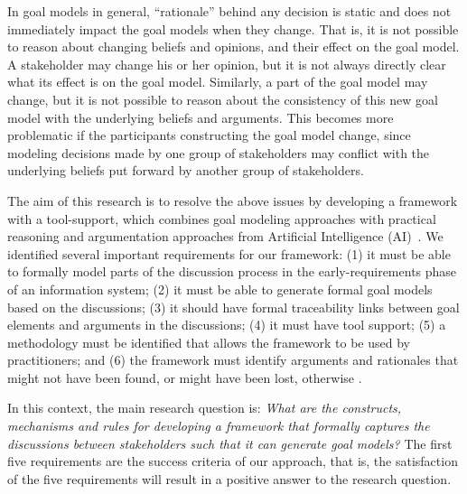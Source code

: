 \begin{enumerate}
In goal models in general, ``rationale'' behind any decision is static and does not immediately impact the goal models when they change. That is, it is not possible to reason about changing beliefs and opinions, and their effect on the goal model. A stakeholder may change his or her opinion, but it is not always directly clear what its effect is on the goal model. Similarly, a part of the goal model may change, but it is not possible to reason about the consistency of this new goal model with the underlying beliefs and arguments. This becomes more problematic if the participants constructing the goal model change, since modeling decisions made by one group of stakeholders may conflict with the underlying beliefs put forward by another group of stakeholders.
\end{enumerate}
 
The aim of this research is to resolve the above issues by developing a framework with a tool-support, which combines goal modeling approaches with practical reasoning and argumentation approaches from Artificial Intelligence (AI)~\cite{atkinson2007}. We identified several important requirements for our framework: (1) it must be able to formally model parts of the discussion process in the early-requirements phase of an information system; (2) it must be able to generate formal goal models based on the discussions; (3) it should have formal traceability links between goal elements and arguments in the discussions; (4) it must have tool support; (5) a methodology must be identified that allows the framework to be used by practitioners; and (6) the framework must identify arguments and rationales that might not have been found, or might have been lost, otherwise %
 . 

In this context, the main research question is: \emph{What are the constructs, mechanisms and rules for developing a framework that formally captures the discussions between stakeholders such that it can generate goal models?} The first five requirements are the success criteria of our approach, that is, the satisfaction of the five requirements will result in a positive answer to the research question. %

